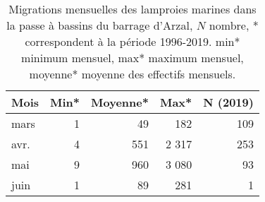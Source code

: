 \begin{table}[htbp]
\centering
\begin{tabular}{lrrrr}
  \hline
Mois & Min* & Moyenne* & Max* & N (2019) \\ 
  \hline
mars & 1 & 49 & 182 & 109 \\ 
  avr. & 4 & 551 & 2 317 & 253 \\ 
  mai & 9 & 960 & 3 080 & 93 \\ 
  juin & 1 & 89 & 281 & 1 \\ 
   \hline
\end{tabular}
\caption{Migrations mensuelles des lamproies marines dans la passe à bassins du barrage d'Arzal, $N$ nombre, * correspondent à
				la période 1996-2019. min* minimum mensuel, max* maximum mensuel, moyenne* moyenne des effectifs mensuels.} 
\label{table_lpm_mois}
\end{table}
